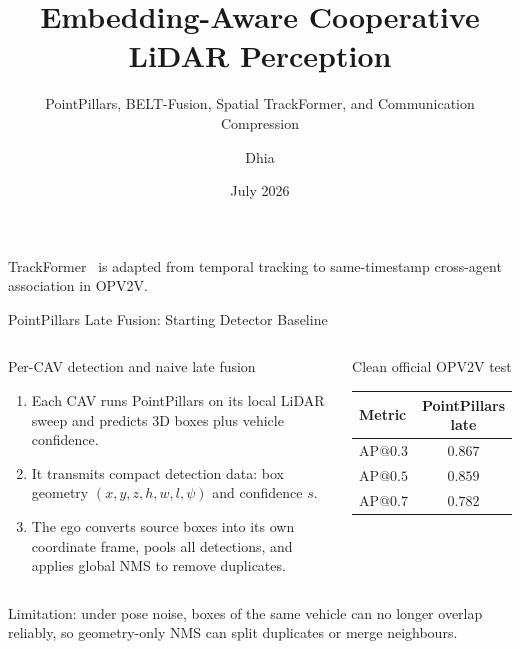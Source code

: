 \documentclass[aspectratio=169,10pt]{beamer}
\title{Embedding-Aware Cooperative LiDAR Perception}
\subtitle{PointPillars, BELT-Fusion, Spatial TrackFormer, and Communication Compression}
\author{Dhia}
\date{July 2026}
\begin{document}
\begin{frame}
  \titlepage
  \vfill
  \centering\small
  TrackFormer~\cite{trackformer} is adapted from temporal tracking to
  same-timestamp cross-agent association in OPV2V.
\end{frame}

\begin{frame}{PointPillars Late Fusion: Starting Detector Baseline}
\small
\begin{columns}[T,onlytextwidth]
\begin{block}{Per-CAV detection and naive late fusion}
\begin{enumerate}\setlength{\itemsep}{4pt}
  \item Each CAV runs PointPillars on its local LiDAR sweep and predicts 3D
  boxes plus vehicle confidence.
  \item It transmits compact detection data: box geometry
  $(x,y,z,h,w,l,\psi)$ and confidence $s$.
  \item The ego converts source boxes into its own coordinate frame, pools
  all detections, and applies global NMS to remove duplicates.
\end{enumerate}
\end{block}

\begin{block}{Clean official OPV2V test}
\centering
\begin{tabular}{lc}
\toprule
Metric & PointPillars late \\
\midrule
$\mathrm{AP@0.3}$ & $0.867$ \\
$\mathrm{AP@0.5}$ & $0.859$ \\
$\mathrm{AP@0.7}$ & $0.782$ \\
\bottomrule
\end{tabular}
\end{block}
\end{columns}

\vspace{3mm}
\centering\footnotesize
\alert{Limitation:} under pose noise, boxes of the same vehicle can no longer
overlap reliably, so geometry-only NMS can split duplicates or merge neighbours.
\end{frame}
\end{document}
